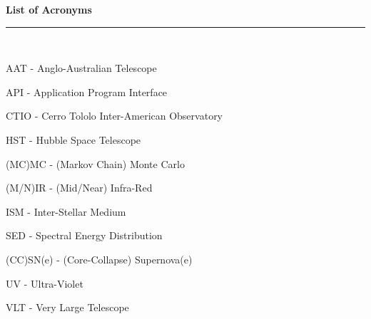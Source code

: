 \thispagestyle{empty}
\begin{raggedleft}
\vspace*{23mm}
\hfill {\huge {\bf {List of Acronyms}}} \\
\vspace{6mm}
\hfill \rule{4in}{.015in} \\
\vspace{19mm}
\end{raggedleft}




%
%

AAT - Anglo-Australian Telescope

API - Application Program Interface

CTIO - Cerro Tololo Inter-American Observatory

HST - Hubble Space Telescope

(MC)MC - (Markov Chain) Monte Carlo

(M/N)IR - (Mid/Near) Infra-Red 

ISM - Inter-Stellar Medium

SED - Spectral Energy Distribution

(CC)SN(e) - (Core-Collapse) Supernova(e)

UV - Ultra-Violet

VLT - Very Large Telescope
